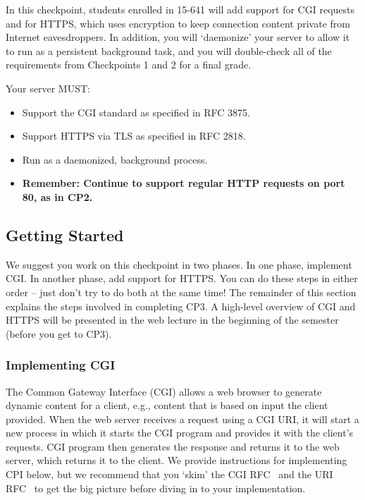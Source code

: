 \label{sec:cp3}
In this checkpoint, students enrolled in 15-641 will add support for
CGI requests and for HTTPS, which uses encryption to keep connection
content private from Internet eavesdroppers.  In addition, you will
`daemonize' your server to allow it to run as a persistent background
task, and you will double-check all of the requirements from
Checkpoints 1 and 2 for a final grade.

\vspace{5pt}
\noindent Your server MUST:
\begin{itemize}
  \item Support the CGI standard as specified in RFC 3875.
  \item Support HTTPS via TLS as specified in RFC 2818.
  \item Run as a daemonized, background process.
  \item {\bf Remember: Continue to support regular HTTP requests on port 80, as in CP2.}
\end{itemize}

\subsection{Getting Started}
We suggest you work on this checkpoint in two phases. In one phase, implement CGI. In another phase, add support for HTTPS. You can do these steps in either order -- just don't try to do both at the same time!  The remainder of this section explains the steps involved in completing CP3.  A high-level overview of
CGI and HTTPS will be presented in the web lecture in the beginning of the semester (before you get to CP3).


\subsubsection{Implementing CGI}
The Common Gateway Interface (CGI) allows a web browser to generate dynamic content for a client, e.g., content that is based on input the client provided.  
When the web server receives a request using a CGI URI, it will start a new process in which it starts the CGI program and provides it with the client's requests.  
CGI program then generates the response and returns it to the web server, which returns it to the client.
We provide instructions for implementing CPI below, but we recommend that you `skim' the CGI RFC~\cite{cgirfc} and the URI RFC~\cite{urirfc} to get 
the big picture before diving in to your implementation.


